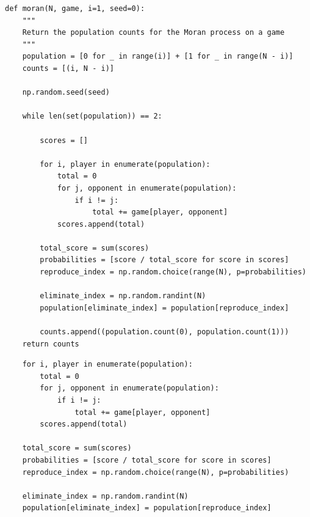 \documentclass{beamer}
\newcommand{\researchfolder}{$HOME/rsc/axelrod-moran}
\begin{document}
    \begin{frame}
        \begin{center}
            \scalebox{.6}{}
        \end{center}
    \end{frame}

    \begin{frame}[fragile]{}
        \begin{center}
            \begin{minipage}{0.7\textwidth}
                \begin{verbatim}
def moran(N, game, i=1, seed=0):
    """
    Return the population counts for the Moran process on a game
    """
    population = [0 for _ in range(i)] + [1 for _ in range(N - i)]
    counts = [(i, N - i)]

    np.random.seed(seed)

    while len(set(population)) == 2:

        scores = []

        for i, player in enumerate(population):
            total = 0
            for j, opponent in enumerate(population):
                if i != j:
                    total += game[player, opponent]
            scores.append(total)

        total_score = sum(scores)
        probabilities = [score / total_score for score in scores]
        reproduce_index = np.random.choice(range(N), p=probabilities)

        eliminate_index = np.random.randint(N)
        population[eliminate_index] = population[reproduce_index]

        counts.append((population.count(0), population.count(1)))
    return counts
            \end{verbatim}
        \end{minipage}
    \end{center}
\end{frame}

    \begin{frame}[fragile]{}
        \begin{center}
            \begin{minipage}{0.7\textwidth}
                \begin{verbatim}
    for i, player in enumerate(population):
        total = 0
        for j, opponent in enumerate(population):
            if i != j:
                total += game[player, opponent]
        scores.append(total)

    total_score = sum(scores)
    probabilities = [score / total_score for score in scores]
    reproduce_index = np.random.choice(range(N), p=probabilities)

    eliminate_index = np.random.randint(N)
    population[eliminate_index] = population[reproduce_index]
            \end{verbatim}
        \end{minipage}
    \end{center}
\end{frame}
\end{document}

